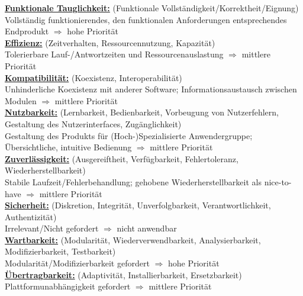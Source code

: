 \textbf{\underline {Funktionale Tauglichkeit:}}
(Funktionale Vollständigkeit/Korrektheit/Eignung) \\
Vollständig funktionierendes, den funktionalen Anforderungen entsprechendes Endprodukt $\Rightarrow$ hohe Priorität\\
\noindent
\textbf{\underline {Effizienz:}}
(Zeitverhalten, Ressourcennutzung, Kapazität)\\
Tolerierbare Lauf-/Antwortzeiten und Ressourcenauslastung $\Rightarrow$ mittlere Priorität\\
\noindent
\textbf{\underline {Kompatibilität:}}
(Koexistenz, Interoperabilität)\\
Unhinderliche Koexistenz mit anderer Software; Informationsaustausch zwischen Modulen $\Rightarrow$ mittlere Priorität\\
\noindent
\textbf{\underline {Nutzbarkeit:}}
(Lernbarkeit, Bedienbarkeit, Vorbeugung von Nutzerfehlern, Gestaltung des Nutzerinterfaces, Zugänglichkeit)\\
Gestaltung des Produkts für (Hoch-)Spezialisierte Anwendergruppe; Übersichtliche, intuitive Bedienung $\Rightarrow$ mittlere Priorität\\
\noindent
\textbf{\underline{Zuverlässigkeit:}}
(Ausgereiftheit, Verfügbarkeit, Fehlertoleranz, Wiederherstellbarkeit)\\
Stabile Laufzeit/Fehlerbehandlung; gehobene Wiederherstellbarkeit als nice-to-have $\Rightarrow$ mittlere Priorität\\
\noindent
\textbf{\underline {Sicherheit:}}
(Diskretion, Integrität, Unverfolgbarkeit, Verantwortlichkeit, Authentizität)\\
Irrelevant/Nicht gefordert $\Rightarrow$ nicht anwendbar\\
\noindent
\textbf{\underline {Wartbarkeit:}}
(Modularität, Wiederverwendbarkeit, Analysierbarkeit, Modifizierbarkeit, Testbarkeit)\\
Modularität/Modifizierbarkeit gefordert $\Rightarrow$ hohe Priorität\\
\noindent
\textbf{\underline {Übertragbarkeit:}}
(Adaptivität, Installierbarkeit, Ersetzbarkeit)\\
Plattformunabhängigkeit gefordert $\Rightarrow$ mittlere Priorität

